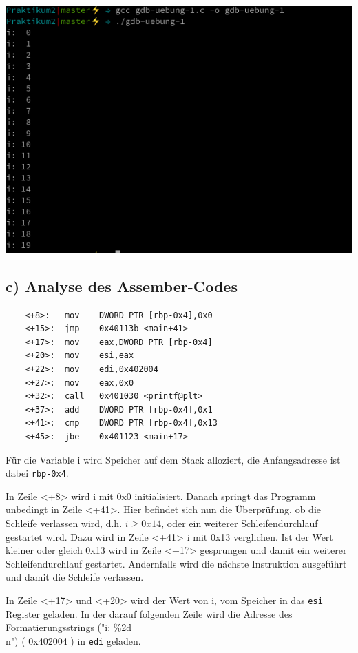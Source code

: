 \documentclass[12pt]{article}
\begin{document}
\begin{center}
   \includegraphics[scale=0.9]{Pictures/aufgabe1b.png}
\end{center}


\subsection{c) Analyse des Assember-Codes}
\begin{lstlisting}
	<+8>:	mov    DWORD PTR [rbp-0x4],0x0
    <+15>:	jmp    0x40113b <main+41>
    <+17>:	mov    eax,DWORD PTR [rbp-0x4]
    <+20>:	mov    esi,eax
    <+22>:	mov    edi,0x402004
    <+27>:	mov    eax,0x0
    <+32>:	call   0x401030 <printf@plt>
    <+37>:	add    DWORD PTR [rbp-0x4],0x1
    <+41>:	cmp    DWORD PTR [rbp-0x4],0x13
    <+45>:	jbe    0x401123 <main+17>
\end{lstlisting}

Für die Variable i wird Speicher auf dem Stack alloziert, die Anfangsadresse ist dabei \texttt{rbp-0x4}.

In Zeile <+8> wird i mit 0x0 initialisiert. Danach springt das Programm unbedingt in Zeile <+41>. Hier befindet sich nun die Überprüfung, ob die Schleife verlassen wird, d.h. $ i \ge 0x14 $, oder ein weiterer Schleifendurchlauf gestartet wird. Dazu wird in Zeile <+41> i mit 0x13 verglichen. Ist der Wert kleiner oder gleich 0x13 wird in Zeile <+17> gesprungen und damit ein weiterer Schleifendurchlauf gestartet. Andernfalls wird die nächste Instruktion ausgeführt und damit die Schleife verlassen.

In Zeile <+17> und <+20> wird der Wert von i, vom Speicher in das \texttt{esi} Register geladen. In der darauf folgenden Zeile wird die Adresse des Formatierungsstrings ("i: \%2d\\n") ( 0x402004 ) in \texttt{edi} geladen.
\end{document}
